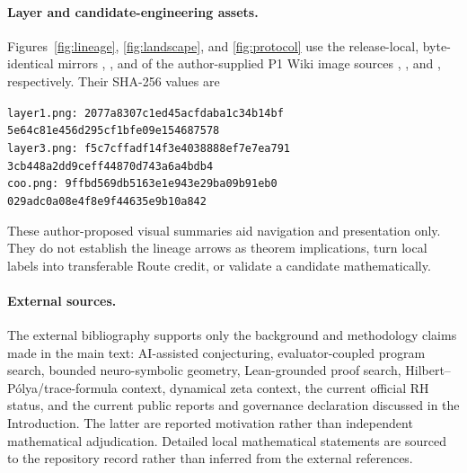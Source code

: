 \paragraph{Layer and candidate-engineering assets.}
Figures~\ref{fig:lineage}, \ref{fig:landscape}, and \ref{fig:protocol} use the release-local,
byte-identical mirrors , , and
 of the author-supplied P1 Wiki image sources
, , and
, respectively. Their SHA-256 values are
\begin{center}\footnotesize
\texttt{layer1.png: 2077a8307c1ed45acfdaba1c34b14bf}\\[-.2ex]
\texttt{5e64c81e456d295cf1bfe09e154687578}\\[.2ex]
\texttt{layer3.png: f5c7cffadf14f3e4038888ef7e7ea791}\\[-.2ex]
\texttt{3cb448a2dd9ceff44870d743a6a4bdb4}\\[.2ex]
\texttt{coo.png: 9ffbd569db5163e1e943e29ba09b91eb0}\\[-.2ex]
\texttt{029adc0a08e4f8e9f44635e9b10a842}
\end{center}
These author-proposed visual summaries aid navigation and presentation only.
They do not establish the lineage arrows as theorem implications, turn local
labels into transferable Route credit, or validate a candidate mathematically.

\paragraph{External sources.}
The external bibliography supports only the background and methodology claims
made in the main text: AI-assisted conjecturing, evaluator-coupled program
search, bounded neuro-symbolic geometry, Lean-grounded proof search,
Hilbert--P\'olya/trace-formula context, dynamical zeta context, the current
official RH status, and the current public reports and governance declaration
discussed in the Introduction. The latter are reported motivation rather than
independent mathematical adjudication. Detailed local mathematical statements
are sourced to the repository record rather than inferred from the external
references.
